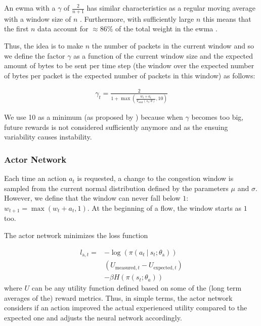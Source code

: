 \documentclass[newfonts=false,format=sigconf,10pt,letterpaper]{acmart}
\newcommand\givenbase[1][]{\:#1\lvert\:}
\let\given\givenbase
\begin{document}
An ewma with a $\gamma$ of $\frac{2}{n+1}$ has similar characteristics as a regular moving average with a window size of $n$ \cite{nahmias_production_2009}. Furthermore, with sufficiently large $n$ this means that the first $n$ data account for $\approx 86\%$ of the total weight in the ewma \cite{boissard_applications_2012}.

Thus, the idea is to make $n$ the number of packets in the current window and so we define the factor $\gamma$ as a function of the current window size and the expected amount of bytes to be sent per time step (the window over the expected number of bytes per packet is the expected number of packets in this window) as follows:

\begin{align}
\gamma_t = \frac{2}{1+\max(\frac{w_t+a_t}{V_\text{sent}(s_t; \theta)},10)}
\end{align}

We use 10 as a minimum (as proposed by \cite{dong_pcc:_2015}) because when $\gamma$ becomes too big, future rewards is not considered sufficiently anymore and as the ensuing variability causes instability. 

\subsubsection{Actor Network}
\label{subsubsec:actor}

Each time an action $a_t$ is requested, a change to the congestion window is sampled from the current normal distribution defined by the parameters $\mu$ and $\sigma$. However, we define that the window can never fall below $1$: $w_{t+1} = \max(w_t + a_t, 1)$. At the beginning of a flow, the window starts as $1$ too.  

The actor network minimizes the loss function

\begin{align}
l_{\text{a},t} =& -\log \left( \pi \left( a_t \given s_t ; \theta_\text{a} \right) \right)\\
& \left( U_{\text{measured},t} - U_{\text{expected},t} \right)\\ 
&- \beta H\left( \pi\left( s_t; \theta_a \right)\right)
\end{align}
where $U$ can be any utility function defined based on some of the (long term averages of the) reward metrics. Thus, in simple terms, the actor network considers if an action improved the actual experienced utility compared to the expected one and adjusts the neural network accordingly.
 
\end{document}
